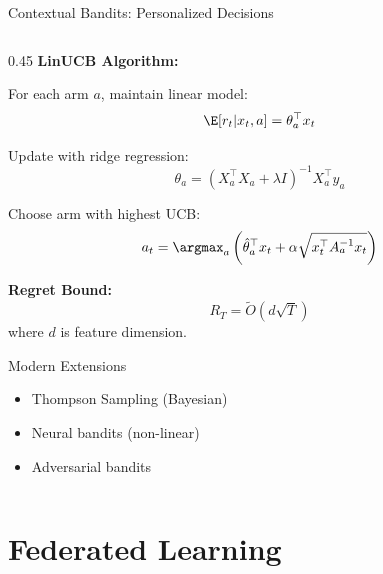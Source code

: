 \begin{frame}[fragile]{Contextual Bandits: Personalized Decisions}
\begin{columns}
\begin{column}{0.45\textwidth}
\vspace{0.3cm}
\textbf{LinUCB Algorithm:}

For each arm $a$, maintain linear model:
\[\E[r_t|x_t, a] = \theta_a^\top x_t\]

Update with ridge regression:
\[\theta_a = (X_a^\top X_a + \lambda I)^{-1} X_a^\top y_a\]

Choose arm with highest UCB:
\[a_t = \argmax_a \left(\hat{\theta}_a^\top x_t + \alpha\sqrt{x_t^\top A_a^{-1} x_t}\right)\]

\vspace{0.3cm}
\textbf{Regret Bound:}
\[R_T = \tilde{O}(d\sqrt{T})\]
where $d$ is feature dimension.

\vspace{0.3cm}
\begin{alertblock}{Modern Extensions}
\begin{itemize}
\item Thompson Sampling (Bayesian)
\item Neural bandits (non-linear)
\item Adversarial bandits
\end{itemize}
\end{alertblock}
\end{column}
\end{columns}
\end{frame}


\section{Federated Learning}

